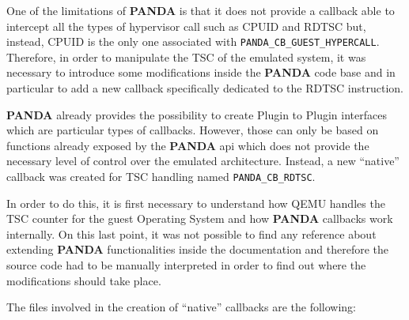 One of the limitations of \textbf{PANDA} is that it does not provide a callback able to intercept all the types of hypervisor call such as CPUID and RDTSC but, instead, CPUID is the only one associated with \lstinline{PANDA_CB_GUEST_HYPERCALL}. Therefore, in order to manipulate the TSC of the emulated system, it was necessary to introduce some modifications inside the \textbf{PANDA} code base and in particular to add a new callback specifically dedicated to the RDTSC instruction. 

\textbf{PANDA} already provides the possibility to create Plugin to Plugin interfaces which are particular types of callbacks. However, those can only be based on functions already exposed by the \textbf{PANDA} api which does not provide the necessary level of control over the emulated architecture. Instead, a new ``native'' callback was created for TSC handling named \lstinline{PANDA_CB_RDTSC}. 

In order to do this, it is first necessary to understand how QEMU handles the TSC counter for the guest Operating System and how \textbf{PANDA} callbacks work internally. On this last point, it was not possible to find any reference about extending \textbf{PANDA} functionalities inside the documentation and therefore the source code had to be manually interpreted in order to find out where the modifications should take place.

The files involved in the creation of ``native'' callbacks are the following: 

